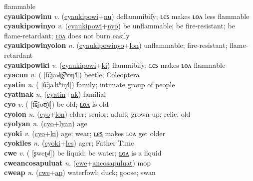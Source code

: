 flammable \label{cyaukipowilon} \\
\textbf{cyaukipowinu} \textit{v.} (\hyperref[cyaukipowi]{cyaukipowi}+\hyperref[nu]{nu})
deflammibify; ʟєꜱ makes ʟᴏᴧ less flammable \label{cyaukipowinu} \\
\textbf{cyaukipowinyo} \textit{v.} (\hyperref[cyaukipowi]{cyaukipowi}+\hyperref[nyo]{nyo})
be unflammable; be fire-resistant; be flame-retardant; \hyperref[cyaukipowinyolon]{ʟᴏᴧ} does not burn easily \label{cyaukipowinyo} \\
\textbf{cyaukipowinyolon} \textit{n.} (\hyperref[cyaukipowinyo]{cyaukipowinyo}+\hyperref[lon]{lon})
unflammable; fire-resistant; flame-retardant \label{cyaukipowinyolon} \\
\textbf{cyaukipowiki} \textit{v.} (\hyperref[cyaukipowi]{cyaukipowi}+\hyperref[ki]{ki})
flammibify; ʟєꜱ makes ʟᴏᴧ flammable \label{cyaukipowiki} \\
\textbf{cyacun} \textit{n.} ( [t͡ɕja˧˩˧ʈ͡ʂʰʊŋ˧˥])
beetle; Coleoptera \label{cyacun} \\
\textbf{cyatin} \textit{n.} ( [t͡ɕja˥tʰiŋ˧˥])
family; intimate group of people \label{cyatin} \\
\textbf{cyatinak} \textit{n.} (\hyperref[cyatin]{cyatin}+\hyperref[ak]{ak})
familial \label{cyatinak} \\
\textbf{cyo} \textit{v.} ( [t͡ɕjoʊ̯˥˩])
be old; \hyperref[cyolon]{ʟᴏᴧ} is old \label{cyo} \\
\textbf{cyolon} \textit{n.} (\hyperref[cyo]{cyo}+\hyperref[lon]{lon})
elder; senior; adult; grown-up; relic; old \label{cyolon} \\
\textbf{cyolyan} \textit{n.} (\hyperref[cyo]{cyo}+\hyperref[lyan]{lyan})
age \label{cyolyan} \\
\textbf{cyoki} \textit{v.} (\hyperref[cyo]{cyo}+\hyperref[ki]{ki})
age; wear; \hyperref[cyokiles]{ʟєꜱ} makes ʟᴏᴧ get older \label{cyoki} \\
\textbf{cyokiles} \textit{n.} (\hyperref[cyoki]{cyoki}+\hyperref[les]{les})
ager; Father Time \label{cyokiles} \\
\textbf{cwe} \textit{v.} ( [ʂweɪ̯˧˩˧])
be liquid; be water; \hyperref[cwelon]{ʟᴏᴧ} is a liquid \label{cwe} \\
\textbf{cweancosapuluat} \textit{n.} (\hyperref[cwe]{cwe}+\hyperref[ancosapuluat]{ancosapuluat})
mop \label{cweancosapuluat} \\
\textbf{cweap} \textit{n.} (\hyperref[cwe]{cwe}+\hyperref[ap]{ap})
waterfowl; duck; goose; swan \label{cweap} \\
